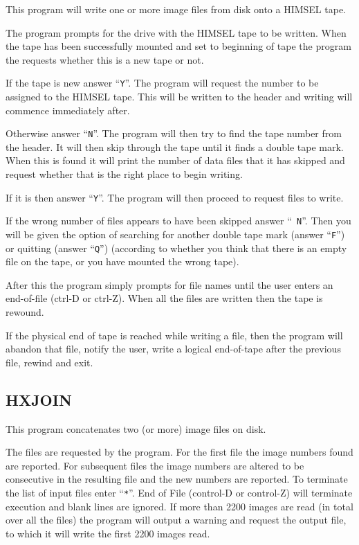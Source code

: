 This program will write one or more image files from disk onto a HIMSEL
tape.

The program prompts for the drive with the HIMSEL tape to be written.
When the tape has been successfully mounted and set to beginning of
tape the program the requests whether this is a new tape or not.
\begin{description}
\item If the tape is new answer ``{\tt Y}''. The program will request the
number to be assigned to the HIMSEL tape. This will be written to the
header and writing will commence immediately after.
\item Otherwise answer ``{\tt N}''. The program will then try to find the  tape
number from the header. It will then skip through the tape until it
finds a double tape mark. When this is found it will print the number
of data files that it has skipped and request whether that is the right
place to begin writing.
\begin{description}
\item If it is then answer ``{\tt Y}''. The program will then proceed to
request files to write.
\item If the wrong number of files appears to have been skipped answer ``{\tt
N}''.  Then you will be given the option of searching for another
double tape mark (answer ``{\tt F}'') or quitting (answer ``{\tt Q}'')
(according to whether you think that there is an empty file on the
tape, or you have mounted the wrong tape).
\end{description}
\end{description}

After this the program simply prompts for file names until the user
enters an end-of-file (ctrl-D or ctrl-Z). When all the files are
written then the tape is rewound.

If the physical end of tape is reached while writing a file, then the
program will abandon that file, notify the user, write a logical
end-of-tape after the previous file, rewind and exit.

\subsection{HXJOIN}
\label{HXJOIN}

This program concatenates two (or more) image files on disk.

The files are requested by the program. For the first file the image
numbers found are reported. For subsequent files the image numbers are
altered to be consecutive in the resulting file and the new numbers are
reported. To terminate the list of input files enter ``{\tt **}''. End
of File (control-D or control-Z) will terminate execution and blank lines are
ignored. If more than 2200 images are read (in total over all the
files) the program will output a warning and request the output file,
to which it will write the first 2200 images read.

